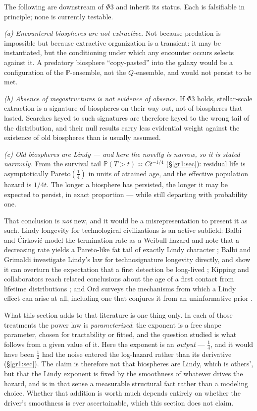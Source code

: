 \documentclass[11pt]{article}
\numberwithin{equation}{section}
\theoremstyle{plain}
\theoremstyle{definition}
\theoremstyle{remark}
\newcommand{\PP}{\mathbb{P}}
\begin{document}
The following are downstream of $\Phi3$ and inherit its status. Each is
falsifiable in principle; none is currently testable.

\emph{(a) Encountered biospheres are not extractive.} Not because
predation is impossible but because extractive organization is a
transient: it may be instantiated, but the conditioning under which any
encounter occurs selects against it. A predatory biosphere
``copy-pasted'' into the galaxy would be a configuration of the
$\PP$-ensemble, not the $Q$-ensemble, and would not persist to be met.

\emph{(b) Absence of megastructures is not evidence of absence.} If
$\Phi3$ holds, stellar-scale extraction is a signature of biospheres on
their way out, not of biospheres that lasted. Searches keyed to such
signatures \cite{Dys60} are therefore keyed to the wrong tail of the
distribution, and their null results carry less evidential weight
against the existence of old biospheres than is usually assumed.

\emph{(c) Old biospheres are Lindy --- and here the novelty is narrow,
so it is stated narrowly.} From the survival tail
$\PP(T>t)\asymp Ct^{-1/4}$ (\S\ref{gr1:sec}): residual life is
asymptotically Pareto$(\tfrac14)$ in units of attained age, and the
effective population hazard is $1/4t$. The longer a biosphere has
persisted, the longer it may be expected to persist, in exact
proportion --- while still departing with probability one.

That conclusion is \emph{not} new, and it would be a misrepresentation
to present it as such. Lindy longevity for technological civilizations
is an active subfield: Balbi and \'Cirkovi\'c model the termination rate
as a Weibull hazard and note that a decreasing rate yields a
Pareto-like fat tail of exactly Lindy character \cite{BC21}; Balbi and
Grimaldi investigate Lindy's law for technosignature longevity directly,
and show it can overturn the expectation that a first detection be
long-lived \cite{BG24}; Kipping and collaborators reach related
conclusions about the age of a first contact from lifetime distributions
\cite{Kip20}; and Ord surveys the mechanisms from which a Lindy effect
can arise at all, including one that conjures it from an uninformative
prior \cite{Ord23,Tal12}.

What this section adds to that literature is one thing only. In each of
those treatments the power law is \emph{parameterized}: the exponent is
a free shape parameter, chosen for tractability or fitted, and the
question studied is what follows from a given value of it. Here the
exponent is an \emph{output} --- $\tfrac14$, and it would have been
$\tfrac12$ had the noise entered the log-hazard rather than its
derivative (\S\ref{gr1:sec}). The claim is therefore not that biospheres are
Lindy, which is others', but that the Lindy exponent is fixed by the
smoothness of whatever drives the hazard, and is in that sense a
measurable structural fact rather than a modeling choice. Whether that
addition is worth much depends entirely on whether the driver's
smoothness is ever ascertainable, which this section does not claim.
\end{document}
